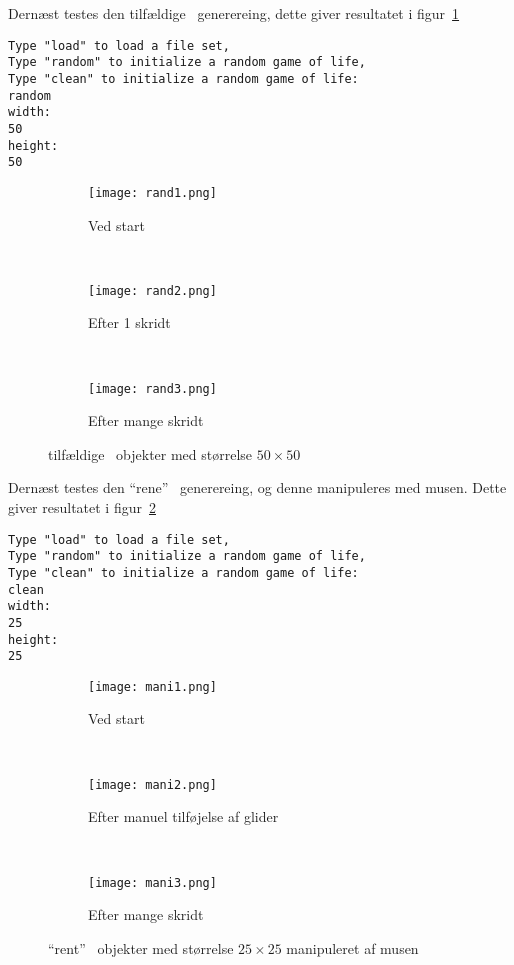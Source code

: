 Dernæst testes den tilfældige \gol~generereing, dette giver resultatet i figur~\ref{fig:rand}
\begin{lstlisting}[caption=" Tilf\ae ldigt game of life p\aa 50x50"]
Type "load" to load a file set,
Type "random" to initialize a random game of life,
Type "clean" to initialize a random game of life:
random
width:
50
height:
50
\end{lstlisting}

\begin{figure}
        \centering
        \begin{subfigure}[b]{0.3\textwidth}
                \centering
                \texttt{[image: rand1.png]}
                \caption{Ved start}
        \end{subfigure}%
        ~
        \begin{subfigure}[b]{0.3\textwidth}
                \centering
                \texttt{[image: rand2.png]}
                \caption{Efter 1 skridt}
        \end{subfigure}
        ~
        \begin{subfigure}[b]{0.3\textwidth}
                \centering
                \texttt{[image: rand3.png]}
                \caption{Efter mange skridt}
        \end{subfigure}
        \caption{tilfældige \gol~objekter med størrelse $50\times50$}\label{fig:rand}
\end{figure}

Dernæst testes den ``rene'' \gol~generereing, og denne manipuleres med musen. Dette giver resultatet i figur~\ref{fig:mani}
\begin{lstlisting}[caption=" Tilf\ae ldigt game of life p\aa 50x50"]
Type "load" to load a file set,
Type "random" to initialize a random game of life,
Type "clean" to initialize a random game of life:
clean
width:
25
height:
25
\end{lstlisting}

\begin{figure}
        \centering
        \begin{subfigure}[b]{0.3\textwidth}
                \centering
                \texttt{[image: mani1.png]}
                \caption{Ved start}
        \end{subfigure}%
        ~
        \begin{subfigure}[b]{0.3\textwidth}
                \centering
                \texttt{[image: mani2.png]}
                \caption{Efter manuel tilføjelse af glider}
        \end{subfigure}
        ~
        \begin{subfigure}[b]{0.3\textwidth}
                \centering
                \texttt{[image: mani3.png]}
                \caption{Efter mange skridt}
        \end{subfigure}
        \caption{``rent'' \gol~objekter med størrelse $25\times25$ manipuleret af musen}\label{fig:mani}
\end{figure}

